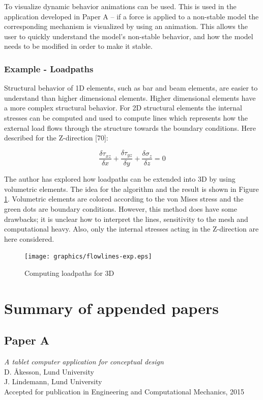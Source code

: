 To visualize dynamic behavior animations can be used. This is used in the application developed in Paper A – if a force is applied to a non-stable model the corresponding mechanism is visualized by using an animation. This allows the user to quickly understand the model’s non-stable behavior, and how the model needs to be modified in order to make it stable. 

\subsection{Example - Loadpaths}
Structural behavior of 1D elements, such as bar and beam elements, are easier to understand than higher dimensional elements. Higher dimensional elements have a more complex structural behavior. For 2D structural elements the internal stresses can be computed and used to compute lines which represents how the external load flows through the structure towards the boundary conditions. Here described for the Z-direction [70]:

\begin{equation*}
\frac{\delta \tau_{xz}}{\delta x} + \frac{\delta \tau_{yz}}{\delta y} + \frac{\delta \sigma_{z}}{\delta z}= 0
\end{equation*}

The author has explored how loadpaths can be extended into 3D by using volumetric elements. The idea for the algorithm and the result is shown in Figure \ref{fig:flowlines-exp}. Volumetric elements are colored according to the von Mises stress and the green dots are boundary conditions. However, this method does have some drawbacks; it is unclear how to interpret the lines, sensitivity to the mesh and computational heavy. Also, only the internal stresses acting in the Z-direction are here considered.
 
\begin{figure}
  \texttt{[image: graphics/flowlines-exp.eps]}
  \caption{Computing loadpaths for 3D}
  \label{fig:flowlines-exp}
\end{figure}



\chapter{Summary of appended papers}
\label{ch:Summary of appended papers}
\section{Paper A}
\textit{A tablet computer application for conceptual design} \\
D. Åkesson, Lund University \\
J. Lindemann, Lund University \\
Accepted for publication in Engineering and Computational Mechanics, 2015

